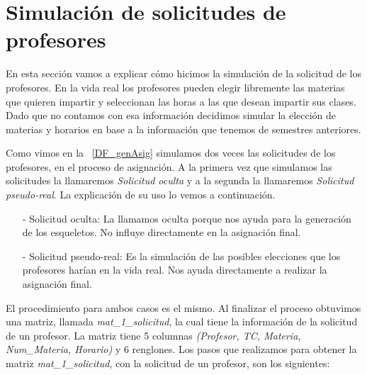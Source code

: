 \section{Simulación de solicitudes de profesores} \label{SimSolicitudesProfesores}

En esta sección vamos a explicar cómo hicimos la simulación de la solicitud de los profesores. En la vida real los profesores pueden elegir libremente las materias que quieren impartir y seleccionan las horas a las que desean impartir sus clases. Dado que no contamos con esa información decidimos simular la elección de materias y horarios en base a la información que tenemos de semestres anteriores.

Como vimos en la \figurename{~\ref{DF_genAsig}} simulamos dos veces las solicitudes de los profesores, en el proceso de asignación. A la primera vez que simulamos las solicitudes la llamaremos \textit{Solicitud oculta} y a la segunda la llamaremos \textit{Solicitud pseudo-real}. La explicación de su uso lo vemos a continuación.

\begin{itemize}
\item[-] Solicitud oculta: La llamamos oculta porque nos ayuda para la generación de los esqueletos. No influye directamente en la asignación final.

\item[-] Solicitud pseudo-real: Es la simulación de las posibles elecciones que los profesores harían en la vida real. Nos ayuda directamente a realizar la asignación final.
\end{itemize}

El procedimiento para ambos casos es el mismo. Al finalizar el proceso obtuvimos una matriz, llamada \textit{mat\_1\_solicitud}, la cual tiene la información de la solicitud de un profesor. La matriz tiene 5 columnas \textit{(Profesor, TC, Materia, Num\_Materia, Horario)} y 6 renglones. Los pasos que realizamos para obtener la matriz \textit{mat\_1\_solicitud}, con la solicitud de un profesor, son los siguientes:


